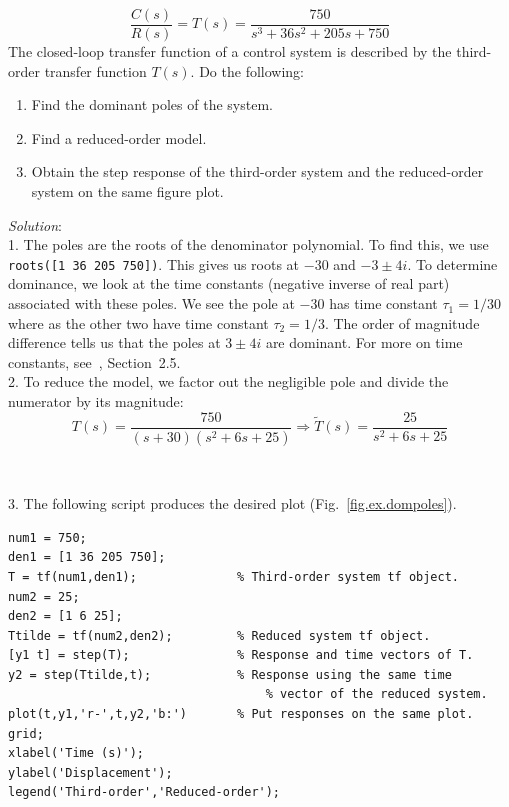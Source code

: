 \begin{workex}  \label{ex.dompoles}
\begin{equation*}
    \frac{C(s)}{R(s)} = T(s) =
        \frac{750}{s^3 + 36s^2 + 205s + 750}
\end{equation*}
The closed-loop transfer function of a control system is described by the third-order transfer function $T(s)$.  Do the following:
\begin{enumerate}
\item
    Find the dominant poles of the system.
\item
    Find a reduced-order model.
\item
    Obtain the step response of the third-order system and the reduced-order system on the same figure plot.
\end{enumerate}
\textit{Solution}:\\
1. The poles are the roots of the denominator polynomial.  To find this, we use \verb=roots([1 36 205 750])=.  This gives us roots at $-30$ and $-3\pm4i$.  To determine dominance, we look at the time constants (negative inverse of real part) associated with these poles.  We see the pole at $-30$ has time constant $\tau_1 = 1/30$ where as the other two have time constant $\tau_2 = 1/3$.  The order of magnitude difference tells us that the poles at $3\pm4i$ are dominant. For more on time constants, see~\cite{dorf}, Section~2.5.\\
2. To reduce the model, we factor out the negligible pole and divide the numerator by its magnitude:
\begin{equation*}
    T(s) = \frac{750}{(s+30)(s^2 + 6s + 25)}
        \Rightarrow \tilde{T}(s) = \frac{25}{s^2 + 6s + 25}
\end{equation*}
\end{workex}\\
\begin{codex}
3. The following script produces the desired plot (Fig.\ \ref{fig.ex.dompoles}).
\begin{verbatim}
num1 = 750;
den1 = [1 36 205 750];
T = tf(num1,den1);              % Third-order system tf object.
num2 = 25;
den2 = [1 6 25];
Ttilde = tf(num2,den2);         % Reduced system tf object.
[y1 t] = step(T);               % Response and time vectors of T.
y2 = step(Ttilde,t);            % Response using the same time
                                    % vector of the reduced system.
plot(t,y1,'r-',t,y2,'b:')       % Put responses on the same plot.
grid;
xlabel('Time (s)');
ylabel('Displacement');
legend('Third-order','Reduced-order');
\end{verbatim}
\end{codex}

